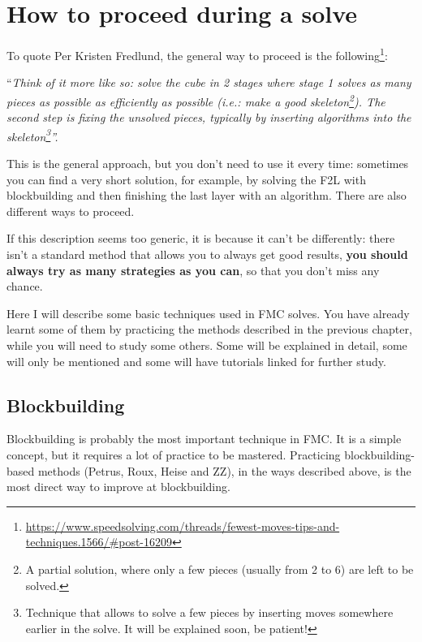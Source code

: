 \documentclass[11pt,a4paper]{book}
\begin{document}
\chapter{How to proceed during a solve}

To quote Per Kristen Fredlund, the general way to proceed is the following\footnote{\url{https://www.speedsolving.com/threads/fewest-moves-tips-and-techniques.1566/\#post-16209}}:

\begin{center}“\emph{Think of it more like so: solve the cube in 2 stages where stage 1 solves as many pieces as possible as efficiently as possible (i.e.: make a good skeleton\footnote{A partial solution, where only a few pieces (usually from 2 to 6) are left to be solved.}). The second step is fixing the unsolved pieces, typically by inserting algorithms into the skeleton\footnote{Technique that allows to solve a few pieces by inserting moves somewhere earlier in the solve. It will be explained soon, be patient!}''.}
\end{center}

This is the general approach, but you don't need to use it every time: sometimes you can find a very short solution, for example, by solving the F2L with blockbuilding and then finishing the last layer with an algorithm. There are also different ways to proceed.

If this description seems too generic, it is because it can't be differently: there isn't a standard method that allows you to always get good results, \textbf{you should always try as many strategies as you can}, so that you don't miss any chance.

Here I will describe some basic techniques used in FMC solves. You have already learnt some of them by practicing the methods described in the previous chapter, while you will need to study some others. Some will be explained in detail, some will only be mentioned and some will have tutorials linked for further study.

\section{Blockbuilding}

Blockbuilding is probably the most important technique in FMC. It is a simple concept, but it requires a lot of practice to be mastered. Practicing blockbuilding-based methods (Petrus, Roux, Heise and ZZ), in the ways described above, is the most direct way to improve at blockbuilding.
\end{document}

